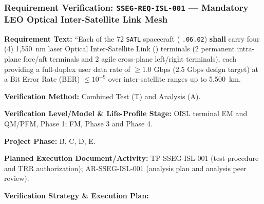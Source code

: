 \subsubsection{Requirement Verification: \texttt{SSEG-REQ-ISL-001} --- Mandatory LEO Optical Inter-Satellite Link Mesh}
\label{ver:SSEG-REQ-ISL-001}
\textbf{Requirement Text:} ``Each of the 72 \texttt{SATL} spacecraft ( \texttt{.06.02}) \textbf{shall} carry four (4) 1,550~nm laser Optical Inter-Satellite Link () terminals (2 permanent intra-plane fore/aft terminals and 2 agile cross-plane left/right terminals), each providing a full-duplex user data rate of $\ge 1.0\text{ Gbps}$ ($2.5\text{ Gbps}$ design target) at a Bit Error Rate ($\text{BER}$) $\le 10^{-9}$ over inter-satellite ranges up to 5,500~km.
\par\textbf{Verification Method:} Combined Test (T) and Analysis (A).
\par\textbf{Verification Level/Model \& Life-Profile Stage:} OISL terminal EM and QM/PFM, Phase 1; FM, Phase 3 and Phase 4.
\par\textbf{Project Phase:} B, C, D, E.
\par\textbf{Planned Execution Document/Activity:} TP-SSEG-ISL-001 (test procedure and TRR authorization); AR-SSEG-ISL-001 (analysis plan and analysis peer review).
\par\textbf{Verification Strategy \& Execution Plan:}
